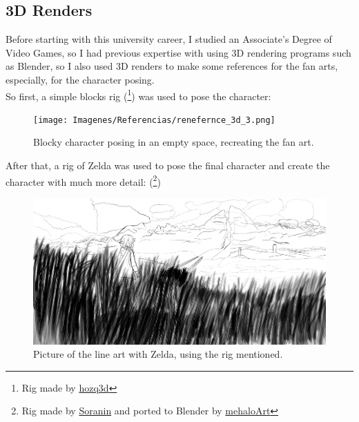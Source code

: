 \documentclass{cup-pan}
\begin{document}
    \subsection*{3D Renders}
    Before starting with this university career, I studied an Associate's Degree of Video Games, so I had previous expertise with using 3D rendering programs such as Blender, so I also used 3D renders to make some references for the fan arts, especially, for the character posing. \\

    So first, a simple blocks rig
        (\footnote{Rig made by 
        \href{https://hozq3d.gumroad.com/l/Blocks}{hozq3d}}) 
    was used to pose the character: 
    \begin{figure}[H]
        \texttt{[image: Imagenes/Referencias/renefernce\_3d\_3.png]}
        \caption{Blocky character posing in an empty space, recreating the fan art.}
    \end{figure}

    After that, a rig of Zelda was used to pose the final character and create the character with much more detail:    
    (\footnote{Rig made by 
    \href{https://www.youtube.com/watch?v=1EUcGBMVRbA}{Soranin} and ported to Blender by  
    \href{https://twitter.com/mehaloArt/status/1528197222751383552?s=20}{mehaloArt}})

    \begin{figure}[H]
        \includegraphics[width=\textwidth]{Imagenes/Referencias/ref_zelda.png}
        \caption{Picture of the line art with Zelda, using the rig mentioned.}
    \end{figure}
\end{document}

